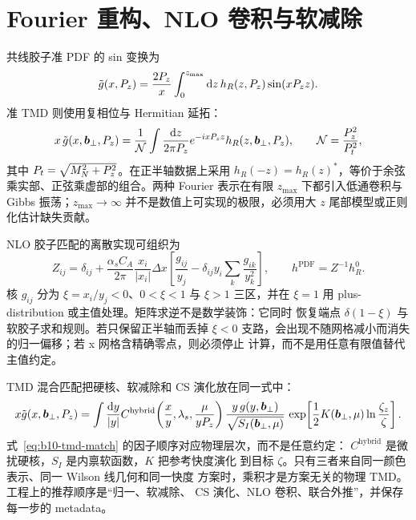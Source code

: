 \section{Fourier 重构、NLO 卷积与软减除}

共线胶子准 PDF 的 sin 变换为
\begin{equation}
  \tilde g(x,P_z)
  =\frac{2P_z}{x}\int_0^{z_{\max}}\mathrm{d} z\,
  h_R(z,P_z)\sin(xP_z z).
  \label{eq:b10-sin}
\end{equation}
准 TMD 则使用复相位与 Hermitian 延拓：
\begin{equation}
  x\,\tilde g(x,\boldsymbol b_\perp,P_z)
  =\frac{1}{\mathcal N}\int\frac{\mathrm{d} z}{2\pi P_z}
  e^{-ixP_z z}h_R(z,\boldsymbol b_\perp,P_z),
  \qquad
  \mathcal N=\frac{P_z^2}{P_t^2},
  \label{eq:b10-quasi-tmd}
\end{equation}
其中 $P_t=\sqrt{M_N^2+P_z^2}$。在正半轴数据上采用
$h_R(-z)=h_R(z)^*$，等价于余弦乘实部、正弦乘虚部的组合。两种 Fourier
表示在有限 $z_{\max}$ 下都引入低通卷积与 Gibbs 振荡；$z_{\max}\to\infty$
并不是数值上可实现的极限，必须用大 $z$ 尾部模型或正则化估计缺失贡献。

NLO 胶子匹配的离散实现可组织为
\begin{equation}
  Z_{ij}=\delta_{ij}+\frac{\alpha_s C_A}{2\pi}
  \frac{x_i}{|x_i|}\Delta x
  \left[\frac{g_{ij}}{y_j}
  -\delta_{ij}y_i\sum_k\frac{g_{ik}}{y_k^2}\right],
  \qquad
  h^{\mathrm{PDF}}=Z^{-1}h_R^0.
  \label{eq:b10-zij}
\end{equation}
核 $g_{ij}$ 分为 $\xi=x_i/y_j<0$、$0<\xi<1$ 与 $\xi>1$ 三区，并在
$\xi=1$ 用 plus-distribution 或主值处理。矩阵求逆不是数学装饰：它同时
恢复端点 $\delta(1-\xi)$ 与软胶子求和规则。若只保留正半轴而丢掉 $\xi<0$
支路，会出现不随网格减小而消失的归一偏移；若 x 网格含精确零点，则必须停止
计算，而不是用任意有限值替代主值约定。

TMD 混合匹配把硬核、软减除和 CS 演化放在同一式中：
\begin{equation}
  x\tilde g(x,\boldsymbol b_\perp,P_z)
  =\int\frac{\mathrm{d} y}{|y|}
  C^{\mathrm{hybrid}}\!\left(\frac{x}{y},\lambda_s,
  \frac{\mu}{yP_z}\right)
  \frac{y\,g(y,\boldsymbol b_\perp)}{\sqrt{S_I(\boldsymbol b_\perp,\mu)}}\,
  \exp\!\left[\frac12K(\boldsymbol b_\perp,\mu)
  \ln\frac{\zeta_z}{\zeta}\right].
  \label{eq:b10-tmd-match}
\end{equation}
式~\eqref{eq:b10-tmd-match} 的因子顺序对应物理层次，而不是任意约定：
$C^{\mathrm{hybrid}}$ 是微扰硬核，$S_I$ 是内禀软函数，$K$ 把参考快度演化
到目标 $\zeta$。只有三者来自同一颜色表示、同一 Wilson 线几何和同一快度
方案时，乘积才是方案无关的物理 TMD。工程上的推荐顺序是“归一、软减除、
CS 演化、NLO 卷积、联合外推”，并保存每一步的 metadata。

